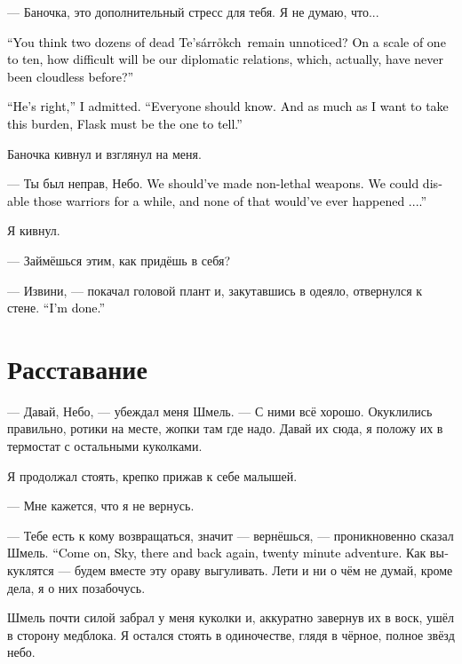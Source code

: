\documentclass[a4paper,12pt,fleqn]{book}\usepackage{cooltooltips}\usepackage{polyglossia}\setdefaultlanguage[babelshorthands=true]{russian}\setotherlanguage{english}\defaultfontfeatures{Ligatures=TeX,Mapping=tex-text} \usepackage{xcolor}\definecolor{lightgray}{HTML}{bbbbbb}\color{lightgray}\newcommand{\ml}[3]{\textenglish{\textcolor{black}{#3}}}
\newcommand{\Tesarrokch}{Te's\'{a}rr\r{o}kch}
\begin{document}
{--- Баночка, это дополнительный стресс для тебя.
Я не думаю, что...

\ml{$0$}
{--- По-твоему, две дюжины трупов царрокх никто не заметит?}
{``You think two dozens of dead \Tesarrokch\ remain unnoticed?}
\ml{$0$}
{На сколько баллов из десяти это осложнит наши и так не безоблачные дипломатические отношения?}
{On a scale of one to ten, how difficult will be our diplomatic relations, which, actually, have never been cloudless before?''}

\ml{$0$}
{--- Он прав, --- признал я.}
{``He's right,'' I admitted.}
\ml{$0$}
{--- Нужно рассказать всем.}
{``Everyone should know.}
\ml{$0$}
{И, как бы мне ни хотелось взять это на себя --- рассказать должен Баночка.}
{And as much as I want to take this burden, Flask must be the one to tell.''}

Баночка кивнул и взглянул на меня.

--- Ты был неправ, Небо.
\ml{$0$}
{Надо было сделать нелетальное оружие.}
{We should've made non-lethal weapons.}
\ml{$0$}
{Мы бы просто временно вывели этих воинов из строя, и ничего этого не было бы...}
{We could disable those warriors for a while, and none of that would've ever happened ....''}

Я кивнул.

--- Займёшься этим, как придёшь в себя?

--- Извини, --- покачал головой плант и, закутавшись в одеяло, отвернулся к стене.
\ml{$0$}
{--- С меня хватит.}
{``I'm done.''}

\section{Расставание}

--- Давай, Небо, --- убеждал меня Шмель.
--- С ними всё хорошо.
Окуклились правильно, ротики на месте, жопки там где надо.
Давай их сюда, я положу их в термостат с остальными куколками.

Я продолжал стоять, крепко прижав к себе малышей.

--- Мне кажется, что я не вернусь.

--- Тебе есть к кому возвращаться, значит --- вернёшься, --- проникновенно сказал Шмель.
\ml{$0$}
{--- Давай, Небо, туда и обратно, приключение на двадцать минут.}
{``Come on, Sky, there and back again, twenty minute adventure.}
Как выкуклятся --- будем вместе эту ораву выгуливать.
Лети и ни о чём не думай, кроме дела, я о них позабочусь.

Шмель почти силой забрал у меня куколки и, аккуратно завернув их в воск, ушёл в сторону медблока.
Я остался стоять в одиночестве, глядя в чёрное, полное звёзд небо.

}
\end{document}
